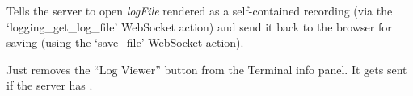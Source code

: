 \documentclass[letterpaper,10pt,openany]{sphinxmanual}
\begin{document}

\begin{fulllineitems}
\label{Applications/terminal/plugin_logging:GateOne.TermLogging.saveRenderedLog}
Tells the server to open \emph{logFile} rendered as a self-contained recording (via the `logging\_get\_log\_file' WebSocket action) and send it back to the browser for saving (using the `save\_file' WebSocket action).

\end{fulllineitems}


\begin{fulllineitems}
\label{Applications/terminal/plugin_logging:GateOne.TermLogging.sessionLoggingDisabled}
Just removes the ``Log Viewer'' button from the Terminal info panel.  It gets sent if the server has .

\end{fulllineitems}

\end{document}

